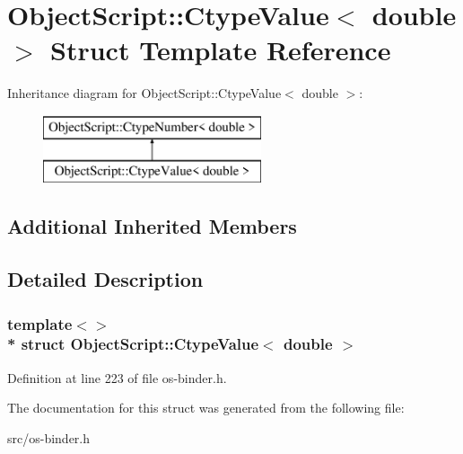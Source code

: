 \hypertarget{struct_object_script_1_1_ctype_value_3_01double_01_4}{}\section{Object\+Script\+:\+:Ctype\+Value$<$ double $>$ Struct Template Reference}
\label{struct_object_script_1_1_ctype_value_3_01double_01_4}
Inheritance diagram for Object\+Script\+:\+:Ctype\+Value$<$ double $>$\+:\begin{figure}[H]
\begin{center}
\leavevmode
\includegraphics[height=2.000000cm]{struct_object_script_1_1_ctype_value_3_01double_01_4}
\end{center}
\end{figure}
\subsection*{Additional Inherited Members}


\subsection{Detailed Description}
\subsubsection*{template$<$$>$\\*
struct Object\+Script\+::\+Ctype\+Value$<$ double $>$}



Definition at line 223 of file os-\/binder.\+h.



The documentation for this struct was generated from the following file\+:\begin{DoxyCompactItemize}
\item 
src/os-\/binder.\+h\end{DoxyCompactItemize}
